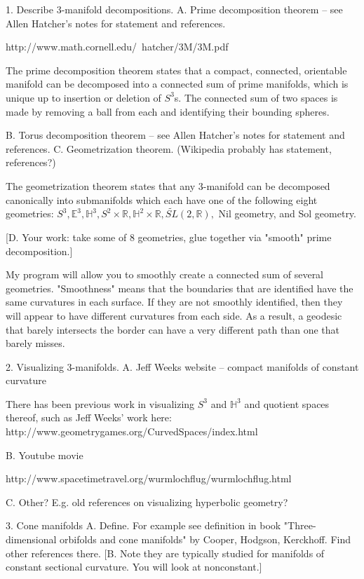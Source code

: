\documentclass[12pt]{amsart}
\newcommand{\ignore}[1]{}
\begin{document}
1.  Describe 3-manifold decompositions.
  A.  Prime decomposition theorem -- see Allen Hatcher's notes for statement and references.

http://www.math.cornell.edu/~hatcher/3M/3M.pdf

\ignore{@Misc{•,
OPTkey = {•},
OPTauthor = {Allen Hatcher},
OPTtitle = {Notes on Basic 3-Manifold Topology},
OPThowpublished = {•},
OPTmonth = {•},
OPTyear = {•},
OPTnote = {•},
OPTannote = {•}
}}


The prime decomposition theorem states that a compact, connected, orientable manifold can be decomposed into a connected sum of prime manifolds, which is unique up to insertion or deletion of $S^3$s. The connected sum of two spaces is made by removing a ball from each and identifying their bounding spheres.
  
  B.  Torus decomposition theorem -- see Allen Hatcher's notes for statement and references.
  C.  Geometrization theorem.  (Wikipedia probably has statement, references?)

The geometrization theorem states that any 3-manifold can be decomposed canonically into submanifolds which each have one of the following eight geometries: $S^3, \mathbb{E}^3, \mathbb{H}^3, S^2 \times \mathbb{R}, \mathbb{H}^2 \times \mathbb{R}, \tilde{SL}(2,\mathbb{R}),$ Nil geometry, and Sol geometry.


  [D.  Your work:  take some of 8 geometries, glue together via "smooth" prime decomposition.]

My program will allow you to smoothly create a connected sum of several geometries. "Smoothness" means that the boundaries that are identified have the same curvatures in each surface. If they are not smoothly identified, then they will appear to have different curvatures from each side. As a result, a geodesic that barely intersects the border can have a very different path than one that barely misses.



2.  Visualizing 3-manifolds.
  A.  Jeff Weeks website -- compact manifolds of constant curvature

There has been previous work in visualizing $S^3$ and $\mathbb{H}^3$ and quotient spaces thereof, such as Jeff Weeks' work here: http://www.geometrygames.org/CurvedSpaces/index.html

  B.  Youtube movie

http://www.spacetimetravel.org/wurmlochflug/wurmlochflug.html

  C.  Other?  E.g. old references on visualizing hyperbolic geometry?

3.  Cone manifolds
  A.  Define.  For example see definition in book "Three-dimensional orbifolds and cone manifolds" by Cooper, Hodgson, Kerckhoff.  Find other references there.
  [B.  Note they are typically studied for manifolds of constant sectional curvature.  You will look at nonconstant.]
\end{document}
